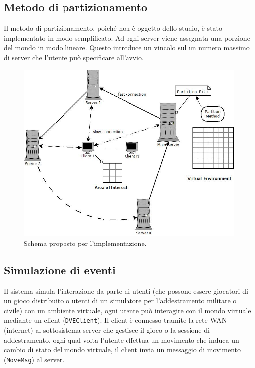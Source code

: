 \documentclass[a4paper, 11pt, oneside]{book}
\newcommand{\files}[1]{\texttt{#1}}
\theoremstyle{definition}
\theoremstyle{remark}
\begin{document}
\subsection{Metodo di partizionamento}
Il metodo di partizionamento, poiché non è oggetto dello studio, è stato
implementato in modo semplificato. Ad ogni server viene assegnata una porzione
del mondo in modo lineare. Questo introduce un vincolo sul un numero massimo di
server che l'utente può specificare all'avvio.

\begin{figure}
\begin{center}
\includegraphics[scale=0.50]{schemaRing.jpeg}
\end{center}
\caption{Schema proposto per l'implementazione.}
\label{fig2}
\end{figure}

\subsection{Simulazione di eventi}
Il sistema simula l'interazione da parte di utenti (che possono essere giocatori
di un gioco distribuito o utenti di un simulatore per l'addestramento militare
o civile) con un ambiente virtuale, ogni utente può interagire con il mondo
virtuale mediante un client (\files{DVEClient}). Il client è connesso tramite
la rete WAN (internet) al sottosistema server che gestisce il gioco o la
sessione di addestramento, ogni qual volta l'utente effettua un movimento che
induca un cambio di stato del mondo virtuale, il client invia un messaggio di
movimento (\files{MoveMsg}) al server.
\end{document}
